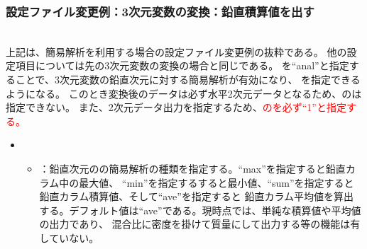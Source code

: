 \subsubsection{設定ファイル変更例：3次元変数の変換：鉛直積算値を出す}

\\

上記は、簡易解析を利用する場合の設定ファイル変更例の抜粋である。
他の設定項目については先の3次元変数の変換の場合と同じである。
を``anal''と指定することで、3次元変数の鉛直次元に対する簡易解析が有効になり、
を指定できるようになる。
このとき変換後のデータは必ず水平2次元データとなるため、のは
指定できない。
また、2次元データ出力を指定するため、\textcolor{red}{のを必ず``1''と指定する。}

\begin{itemize}
 \item {}
 \begin{itemize}
  \item {}：鉛直次元のの簡易解析の種類を指定する。``max''を指定すると鉛直カラム中の最大値、
        ``min''を指定するすると最小値、``sum''を指定すると鉛直カラム積算値、そして``ave''を指定すると
        鉛直カラム平均値を算出する。デフォルト値は``ave''である。現時点では、単純な積算値や平均値の出力であり、
        混合比に密度を掛けて質量にして出力する等の機能は有していない。
 \end{itemize}
\end{itemize}

